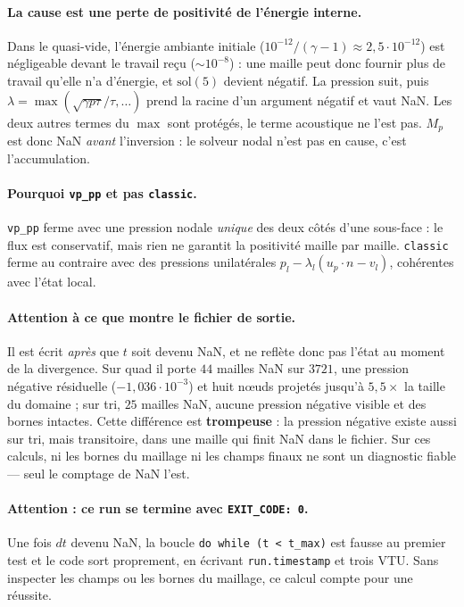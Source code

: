 \documentclass[11pt,a4paper]{article}
\begin{document}
\paragraph{La cause est une perte de positivité de l'énergie interne.} Dans le
quasi-vide, l'énergie ambiante initiale ($10^{-12}/(\gamma-1) \approx
2{,}5\cdot10^{-12}$) est négligeable devant le travail reçu ($\sim\!10^{-8}$) : une
maille peut donc fournir plus de travail qu'elle n'a d'énergie, et $\mathrm{sol}(5)$
devient négatif. La pression suit, puis $\lambda = \max(\sqrt{\gamma p \tau}/\tau,
\dots)$ prend la racine d'un argument négatif et vaut NaN. Les deux autres termes du
$\max$ sont protégés, le terme acoustique ne l'est pas. $M_p$ est donc NaN
\emph{avant} l'inversion : le solveur nodal n'est pas en cause, c'est l'accumulation.

\paragraph{Pourquoi \texttt{vp\_pp} et pas \texttt{classic}.} \texttt{vp\_pp} ferme
avec une pression nodale \emph{unique} des deux côtés d'une sous-face : le flux est
conservatif, mais rien ne garantit la positivité maille par maille. \texttt{classic}
ferme au contraire avec des pressions unilatérales $p_l-\lambda_l(u_p\!\cdot\!n-v_l)$,
cohérentes avec l'état local.

\paragraph{Attention à ce que montre le fichier de sortie.} Il est écrit \emph{après}
que $t$ soit devenu NaN, et ne reflète donc pas l'état au moment de la divergence. Sur
quad il porte $44$ mailles NaN sur $3721$, une pression négative résiduelle
($-1{,}036\cdot10^{-3}$) et huit n\oe{}uds projetés jusqu'à $5{,}5\times$ la taille du
domaine ; sur tri, $25$ mailles NaN, aucune pression négative visible et des bornes
intactes. Cette différence est \textbf{trompeuse} : la pression négative existe aussi
sur tri, mais transitoire, dans une maille qui finit NaN dans le fichier. Sur ces
calculs, ni les bornes du maillage ni les champs finaux ne sont un diagnostic fiable
--- seul le comptage de NaN l'est.

\paragraph{Attention : ce run se termine avec \texttt{EXIT\_CODE: 0}.} Une fois $dt$
devenu NaN, la boucle \texttt{do while (t < t\_max)} est fausse au premier test et le
code sort proprement, en écrivant \texttt{run.timestamp} et trois VTU. Sans inspecter
les champs ou les bornes du maillage, ce calcul compte pour une réussite.
\end{document}
